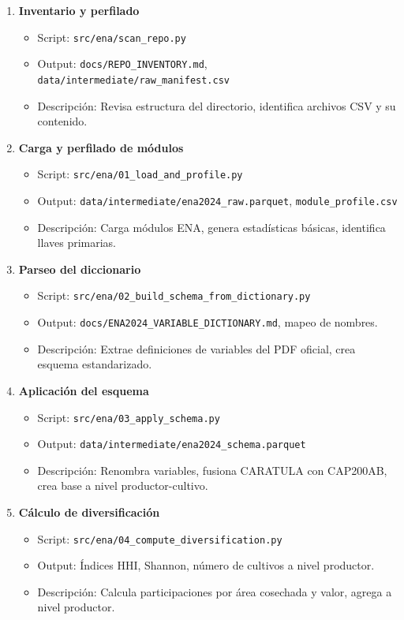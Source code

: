 \documentclass[11pt,a4paper]{article}
\begin{document}
\begin{enumerate}
    \item \textbf{Inventario y perfilado}
    \begin{itemize}
        \item Script: \texttt{src/ena/scan\_repo.py}
        \item Output: \texttt{docs/REPO\_INVENTORY.md}, \texttt{data/intermediate/raw\_manifest.csv}
        \item Descripción: Revisa estructura del directorio, identifica archivos CSV y su contenido.
    \end{itemize}
    
    \item \textbf{Carga y perfilado de módulos}
    \begin{itemize}
        \item Script: \texttt{src/ena/01\_load\_and\_profile.py}
        \item Output: \texttt{data/intermediate/ena2024\_raw.parquet}, \texttt{module\_profile.csv}
        \item Descripción: Carga módulos ENA, genera estadísticas básicas, identifica llaves primarias.
    \end{itemize}
    
    \item \textbf{Parseo del diccionario}
    \begin{itemize}
        \item Script: \texttt{src/ena/02\_build\_schema\_from\_dictionary.py}
        \item Output: \texttt{docs/ENA2024\_VARIABLE\_DICTIONARY.md}, mapeo de nombres.
        \item Descripción: Extrae definiciones de variables del PDF oficial, crea esquema estandarizado.
    \end{itemize}
    
    \item \textbf{Aplicación del esquema}
    \begin{itemize}
        \item Script: \texttt{src/ena/03\_apply\_schema.py}
        \item Output: \texttt{data/intermediate/ena2024\_schema.parquet}
        \item Descripción: Renombra variables, fusiona CARATULA con CAP200AB, crea base a nivel productor-cultivo.
    \end{itemize}
    
    \item \textbf{Cálculo de diversificación}
    \begin{itemize}
        \item Script: \texttt{src/ena/04\_compute\_diversification.py}
        \item Output: Índices HHI, Shannon, número de cultivos a nivel productor.
        \item Descripción: Calcula participaciones por área cosechada y valor, agrega a nivel productor.
    \end{itemize}
    

\end{enumerate}
\end{document}
